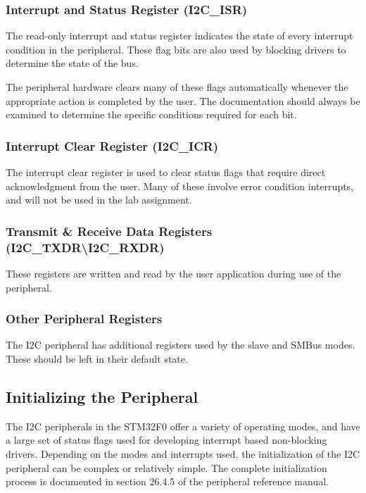 \documentclass[11pt,fleqn]{book} %
\begin{document}
    \subsubsection{Interrupt and Status Register (I2C\_ISR)}
    The read-only interrupt and status register indicates the state of every interrupt condition in the peripheral. These flag bits are also used by blocking drivers to determine the state of the bus.
    
    The peripheral hardware clears many of these flags automatically whenever the appropriate action is completed by the user. The documentation should always be examined to determine the specific conditions required for each bit. 
    \subsubsection{Interrupt Clear Register (I2C\_ICR)}
    The interrupt clear register is used to clear status flags that require direct acknowledgment from the user. Many of these involve error condition interrupts, and will not be used in the lab assignment.
    
    \subsubsection{Transmit \& Receive Data Registers (I2C\_TXDR{\textbackslash}I2C\_RXDR)}
    These registers are written and read by the user application during use of the peripheral. 
    
    \subsubsection{Other Peripheral Registers}
    The I2C peripheral has additional registers used by the slave and SMBus modes. These should be left in their default state.

\subsection{Initializing the Peripheral}
   
    The I2C peripherals in the STM32F0 offer a variety of operating modes, and have a large set of status flags used for developing interrupt based non-blocking drivers. Depending on the modes and interrupts used, the initialization of the I2C peripheral can be complex or relatively simple. The complete initialization process is documented in section 26.4.5 of the peripheral reference manual. 
    
\end{document}
